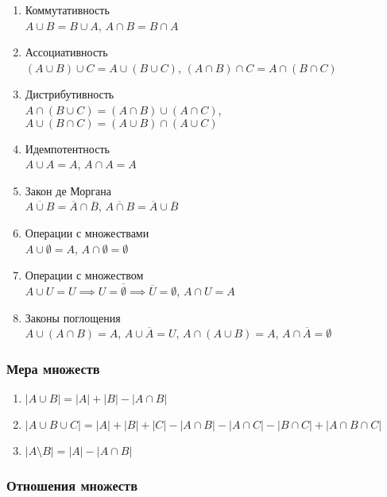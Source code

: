 \documentclass{article}
\begin{document}
\begin{enumerate}
    \item Коммутативность \\
    $A \cup B = B \cup A$, $A \cap B = B \cap A$
    \item Ассоциативность \\
    $(A \cup B) \cup C = A \cup (B \cup C)$, $(A \cap B) \cap C = A \cap (B \cap C)$
    \item Дистрибутивность \\
    $A \cap (B \cup C) = (A \cap B) \cup (A \cap C)$, $A \cup (B \cap C) = (A \cup B) \cap (A \cup C)$
    \item Идемпотентность \\
    $A \cup A = A$, $A \cap A = A$
    \item Закон де Моргана \\
    $\overline{A \cup B} = \overline{A} \cap \overline{B}$, $\overline{A \cap B} = \overline{A} \cup \overline{B}$
    \item Операции с множествами \\
    $A \cup \emptyset = A$, $A \cap \emptyset = \emptyset$
    \item Операции с множеством \\
    $A \cup U = U \implies U = \overline{\emptyset} \implies \overline{U} = \emptyset$, $A \cap U = A$
    \item Законы поглощения \\
    $A \cup (A \cap B) = A$, $A \cup \overline{A} = U$, $A \cap (A \cup B) = A$, $A \cap \overline{A} = \emptyset$
\end{enumerate}

\subsubsection{Мера множеств}

\begin{enumerate}
    \item $|A \cup B| = |A| + |B| - |A \cap B|$
    \item $|A \cup B \cup C| = |A| + |B| + |C| - |A \cap B| - |A \cap C| - |B \cap C| + |A \cap B \cap C|$
    \item $|A \setminus B| = |A| - |A \cap B|$
\end{enumerate}

\subsubsection{Отношения множеств}
\end{document}

